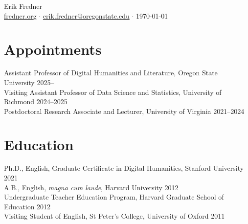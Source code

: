 \documentclass[12pt, letterpaper]{article}
\begin{document}
\begin{center}
    {\Large{Erik Fredner}} \\
    {\color{gray} \footnotesize \href{https://fredner.org}{fredner.org} $\cdot$ \href{mailto:erik.fredner@oregonstate.edu}{erik.fredner@oregonstate.edu} $\cdot$ \today}
\end{center}

\section{Appointments}
Assistant Professor of Digital Humanities and Literature, Oregon State University \hfill 2025-- \\
Visiting Assistant Professor of Data Science and Statistics, University of Richmond \hfill 2024--2025 \\
Postdoctoral Research Associate and Lecturer, University of Virginia \hfill 2021--2024

\section{Education}
Ph.D., English, Graduate Certificate in Digital Humanities, Stanford University \hfill 2021 \\
A.B., English, \textit{magna cum laude}, Harvard University \hfill 2012 \\
Undergraduate Teacher Education Program, Harvard Graduate School of Education \hfill 2012 \\
Visiting Student of English, St Peter's College, University of Oxford \hfill 2011

\end{document}
